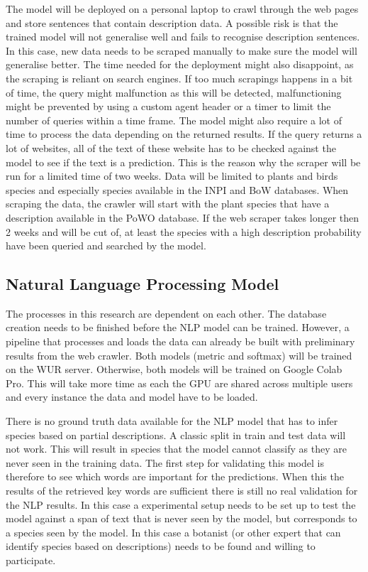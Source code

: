\documentclass[a4paper, 12pt, oneside]{book} %
\begin{document}
The model will be deployed on a personal laptop to crawl through the web pages and store sentences that contain description data.
A possible risk is that the trained model will not generalise well and fails to recognise description sentences.
In this case, new data needs to be scraped manually to make sure the model will generalise better.
The time needed for the deployment might also disappoint, as the scraping is reliant on search engines.
If too much scrapings happens in a bit of time, the query might malfunction as this will be detected, malfunctioning might be prevented by using a custom agent header or a timer to limit the number of queries within a time frame.
The model might also require a lot of time to process the data depending on the returned results.
If the query returns a lot of websites, all of the text of these website has to be checked against the model to see if the text is a prediction.
This is the reason why the scraper will be run for a limited time of two weeks.
Data will be limited to plants and birds species and especially species available in the INPI and BoW databases.
When scraping the data, the crawler will start with the plant species that have a description available in the PoWO database. 
If the web scraper takes longer then 2 weeks and will be cut of, at least the species with a high description probability have been queried and searched by the model.


\subsection{Natural Language Processing Model}
The processes in this research are dependent on each other.
The database creation needs to be finished before the NLP model can be trained.
However, a pipeline that processes and loads the data can already be built with preliminary results from the web crawler.
Both models (metric and softmax) will be trained on the WUR server.
Otherwise, both models will be trained on Google Colab Pro.
This will take more time as each the GPU are shared across multiple users and every instance the data  and model have to be loaded.

\thispagestyle{empty} %

There is no ground truth data available for the NLP model that has to infer species based on partial descriptions.
A classic split in train and test data will not work. 
This will result in species that the model cannot classify as they are never seen in the training data.
The first step for validating this model is therefore to see which words are important for the predictions.
When this the results of the retrieved key words are sufficient there is still no real validation for the NLP results.
In this case a experimental setup needs to be set up to test the model against a span of text that is never seen by the model, but corresponds to a species seen by the model.
In this case a botanist (or other expert that can identify species based on descriptions) needs to be found and willing to participate.

\printbibliography
\end{document}
